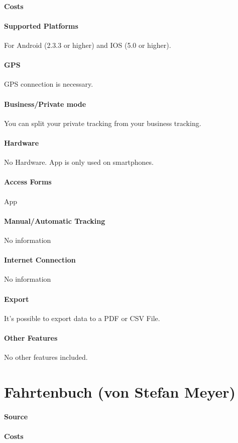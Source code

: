 \paragraph{Costs} 
\paragraph{Supported Platforms} For Android (2.3.3 or higher) and IOS (5.0 or higher).
\paragraph{GPS} GPS connection is necessary.
\paragraph{Business/Private mode} You can split your private tracking from your business tracking.
\paragraph{Hardware} No Hardware. App is only used on smartphones.
\paragraph{Access Forms} App
\paragraph{Manual/Automatic Tracking} No information
\paragraph{Internet Connection}No information
\paragraph{Export} It’s possible to export data to a PDF or CSV File.
\paragraph{Other Features} No other features included.
\newpage
\section{Fahrtenbuch (von Stefan Meyer)}
\paragraph{Source} 
\paragraph{Costs} 
